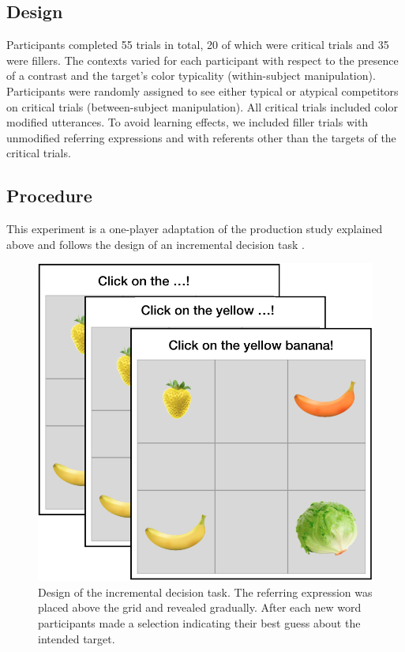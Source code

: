 \documentclass[10pt,letterpaper]{article}
\begin{document}
\subsection{Design}

Participants completed 55 trials in total, 20 of which were critical trials and 35 were fillers. The contexts varied for each participant with respect to the presence of a contrast and the target's color typicality (within-subject manipulation). Participants were randomly assigned to see either typical or atypical competitors on critical trials (between-subject manipulation). All critical trials included color modified utterances. 
To avoid learning effects, we included filler trials with unmodified referring expressions and with referents other than the targets of the critical trials. 



\subsection{Procedure}
This experiment is a one-player adaptation of the production study explained above and follows the design of an incremental decision task \cite{Qing:2018}. 

\begin{figure}
	\begin{center}
		\includegraphics[width=.35\textwidth]{graphs/IDT-design.pdf}
	\end{center}
\caption{Design of the incremental decision task. The referring expression was placed above the grid and revealed gradually. After each new word participants made a selection indicating their best guess about the intended target.} 
\label{prod-results}
\end{figure}
\end{document}
